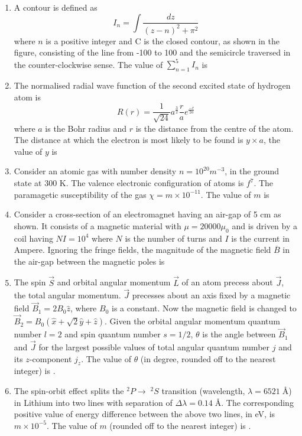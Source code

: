 \documentclass[journal]{IEEEtran}
\begin{document}
\begin{enumerate}
	\item A contour is defined as 
		$$ I_n = \int \frac{dz}{(z-n)^2 + \pi^2} $$
		where $n$ is a positive integer and C is the closed contour, as shown in the figure, consisting of the line from -100 to 100 and the semicircle traversed in the counter-clockwise sense. The value of $\sum_{n=1}^{5} I_n $ is
	\item The normalised radial wave function of the second excited state of hydrogen atom is 
		$$ R(r) = \frac{1}{\sqrt{24}} a^{\frac{3}{2}} \frac{r}{a} e^{\frac{-r}{2a}} $$
		where $a$ is the Bohr radius and $r$ is the distance from the centre of the atom. The distance at which the electron is most likely to be found is $y \times a$, the value of $y$ is
	\item Consider an atomic gas with number density $n = 10^{20} m^{-3} $, in the ground state at 300 K. The valence electronic configuration of atoms is $f^7$. The paramagetic susceptibility of the gas $\chi = m \times 10^{-11}$. The value of $m$ is
	\item Consider a cross-section of an electromagnet having an air-gap of 5 cm as shown. It consists of a magnetic material with $\mu = 20000 \mu_0$ and is driven by a coil having $NI = 10^4$ where $N$ is the number of turns and $I$ is the current in Ampere.
		Ignoring the fringe fields, the magnitude of the magnetic field $\overline{B}$ in the air-gap between the magnetic poles is
	\item The spin $\vec{S}$ and orbital angular momentum $\vec{L}$ of an atom precess about $\vec{J}$, the total angular momentum. $\vec{J}$ precesses about an axis fixed by a magnetic field $\vec{B}_1 = 2B_0 \hat{z}$, where $B_0$ is a constant. Now the magnetic field is changed to
 $\vec{B}_2 = B_0 (\hat{x} + \sqrt{2} \hat{y} + \hat{z}).$ Given the orbital angular momentum quantum number $l = 2$ and spin quantum number $s = 1/2$, $\theta$ is the angle between $\vec{B}_1$ and $\vec{J}$ for the largest possible values of total angular quantum number $j$ and its $z$-component $j_z$. The value of $\theta$ (in degree, rounded off to the nearest integer) is \underline{  }.
	\item The spin-orbit effect splits the $^2P \rightarrow \; ^2S$ transition (wavelength, $\lambda = 6521 \; \text{\AA}$) in Lithium into two lines with separation of $\Delta \lambda = 0.14 \; \text{\AA}$. The corresponding positive value of energy difference between the above two lines, in eV, is $m \times 10^{-5}$. The value of $m$ (rounded off to the nearest integer) is \underline{ }.

\end{enumerate}
\end{document}
